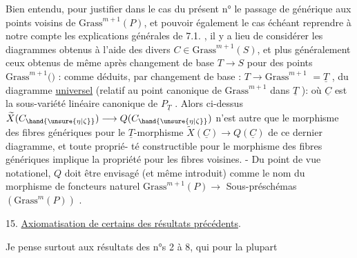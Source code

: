 
Bien entendu, pour justifier dans le cas  du présent n° le passage
de \hand{$\eta$} générique aux points voisins de $\mathrm{Grass}^{m+1}(P)$, et pouvoir également
le cas échéant reprendre à notre compte les explications générales de
7.1. , il y a lieu de considérer les diagrammes
obtenus à l'aide des divers $C \in \mathrm{Grass}^{m+1}(S)$, et plus généralement ceux obtenus de même
après changement de base $T \to S$ pour des points \hand{$\zeta$} \hand{$\in$} $\mathrm{Grass}^{m+1}($$)$ :
comme déduits, par changement de base \hand{$\zeta$} : $T \longrightarrow \mathrm{Grass}^{m+1}$ $= \underline{T}$ ,
du diagramme \uline{universel} (relatif au point canonique de $\mathrm{Grass}^{m+1}$ dans $\underline{T}$ ):
où $\underline{C}$ est la sous-variété linéaire canonique de $P_{\underline{T}}$ . Alors ci-dessus
$\widetilde{X}(C_{\hand{\unsure{\eta|\zeta}}}) \longrightarrow Q(C_{\hand{\unsure{\eta|\zeta}}})$ n'est autre que le morphisme des fibres génériques pour
le $\underline{T}$-morphisme $\widetilde{X}(\underline{C}) \longrightarrow Q(\underline{C})$ de ce dernier diagramme, et toute propri\'e-%
té constructible pour  le morphisme des fibres génériques implique
la propriété pour les fibres voisines. - Du point de vue notationel,
$Q$ doit être envisagé (et même introduit) comme le nom du morphisme de foncteurs
naturel $\mathrm{Grass}^{m+1}(P) \longrightarrow$  Sous-préschémas $(\mathrm{Grass}^{m}(P))$ .

15. \uline{Axiomatisation de certains des résultats précédents}.

Je pense surtout aux résultats des n°s 2 à 8, qui pour la plupart

